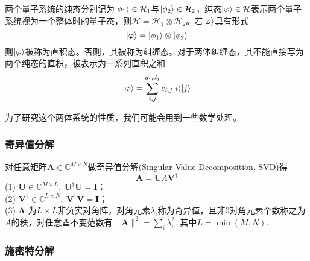 两个量子系统的纯态分别记为$\lvert\phi_1\rangle\in\mathcal{H}_1$与$\lvert\phi_2\rangle\in\mathcal{H}_2$，纯态$\lvert\varphi\rangle\in\mathcal{H}$表示两个量子系统视为一个整体时的量子态，则$\mathcal{H} = \mathcal{H}_1\otimes\mathcal{H}_2$。若$\lvert\varphi\rangle$具有形式
\begin{equation}\label{eq-product-state}
\lvert\varphi\rangle=\lvert\phi_1\rangle\otimes\lvert\phi_2\rangle
\end{equation}
则$\lvert\varphi\rangle$被称为直积态。否则，其被称为纠缠态。对于两体纠缠态，其不能直接写为两个纯态的直积，被表示为一系列直积之和
\begin{equation}\label{eq-product-state-sum}
\lvert\varphi\rangle = \sum_{i,j}^{d_i,d_j} c_{i,j}\lvert i\rangle\lvert j\rangle
\end{equation}

为了研究这个两体系统的性质，我们可能会用到一些数学处理。

\subsubsection{奇异值分解}

对任意矩阵$\symbf{A}\in\mathbb{C}^{M\times N}$做奇异值分解\cite{stewartEarlyHistorySingular1993}(Singular Value Decomposition, SVD)得
\begin{equation}\label{eq-SVD}
\symbf{A} = \symbf{U} \Lambda \symbf{V}^\dagger
\end{equation}
(1) $\symbf{U}\in\mathbb{C}^{M\times L},\: \symbf{U}^\dagger \symbf{U}=\symbf{I}$；\\(2) $\symbf{V}^\dagger\in\mathbb{C}^{L\times N},\: \symbf{V}^\dagger \symbf{V}=\symbf{I}$；\\(3) $\symbf{\Lambda}$ 为$L\times L$非负实对角阵，对角元素$\lambda_i$称为奇异值，且非$0$对角元素个数称之为$A$的秩，对任意酉不变范数有$\lVert \symbf{A} \rVert^2=\sum_i \lambda_i^2$. 其中$L=\min(M,N)$.

\subsubsection{施密特分解}

